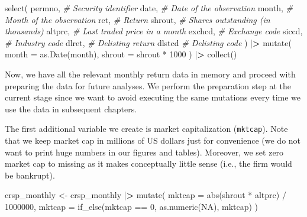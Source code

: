 \documentclass[
]{book}
\newenvironment{Shaded}{\begin{snugshade}}{\end{snugshade}}
\newcommand{\AttributeTok}[1]{\textcolor[rgb]{0.61,0.61,0.61}{#1}}
\newcommand{\CommentTok}[1]{\textcolor[rgb]{0.37,0.37,0.37}{\textit{#1}}}
\newcommand{\ConstantTok}[1]{\textcolor[rgb]{0,0,0}{#1}}
\newcommand{\DecValTok}[1]{\textcolor[rgb]{0.06,0.06,0.06}{#1}}
\newcommand{\ErrorTok}[1]{\textcolor[rgb]{0.14,0.14,0.14}{\textbf{#1}}}
\newcommand{\FunctionTok}[1]{\textcolor[rgb]{0,0,0}{#1}}
\newcommand{\NormalTok}[1]{#1}
\newcommand{\OtherTok}[1]{\textcolor[rgb]{0.37,0.37,0.37}{#1}}
\newcommand{\SpecialCharTok}[1]{\textcolor[rgb]{0,0,0}{#1}}
\begin{document}
\begin{Shaded}
\begin{Highlighting}[]
  \FunctionTok{select}\NormalTok{(}
\NormalTok{    permno, }\CommentTok{\# Security identifier}
\NormalTok{    date, }\CommentTok{\# Date of the observation}
\NormalTok{    month, }\CommentTok{\# Month of the observation}
\NormalTok{    ret, }\CommentTok{\# Return}
\NormalTok{    shrout, }\CommentTok{\# Shares outstanding (in thousands)}
\NormalTok{    altprc, }\CommentTok{\# Last traded price in a month}
\NormalTok{    exchcd, }\CommentTok{\# Exchange code}
\NormalTok{    siccd, }\CommentTok{\# Industry code}
\NormalTok{    dlret, }\CommentTok{\# Delisting return}
\NormalTok{    dlstcd }\CommentTok{\# Delisting code}
\NormalTok{  ) }\SpecialCharTok{|}\ErrorTok{\textgreater{}}
  \FunctionTok{mutate}\NormalTok{(}
    \AttributeTok{month =} \FunctionTok{as.Date}\NormalTok{(month),}
    \AttributeTok{shrout =}\NormalTok{ shrout }\SpecialCharTok{*} \DecValTok{1000}
\NormalTok{  ) }\SpecialCharTok{|}\ErrorTok{\textgreater{}}
  \FunctionTok{collect}\NormalTok{()}
\end{Highlighting}
\end{Shaded}

Now, we have all the relevant monthly return data in memory and proceed with preparing the data for future analyses. We perform the preparation step at the current stage since we want to avoid executing the same mutations every time we use the data in subsequent chapters.

The first additional variable we create is market capitalization (\texttt{mktcap}). Note that we keep market cap in millions of US dollars just for convenience (we do not want to print huge numbers in our figures and tables). Moreover, we set zero market cap to missing as it makes conceptually little sense (i.e., the firm would be bankrupt).

\begin{Shaded}
\begin{Highlighting}[]
\NormalTok{crsp\_monthly }\OtherTok{\textless{}{-}}\NormalTok{ crsp\_monthly }\SpecialCharTok{|}\ErrorTok{\textgreater{}}
  \FunctionTok{mutate}\NormalTok{(}
    \AttributeTok{mktcap =} \FunctionTok{abs}\NormalTok{(shrout }\SpecialCharTok{*}\NormalTok{ altprc) }\SpecialCharTok{/} \DecValTok{1000000}\NormalTok{,}
    \AttributeTok{mktcap =} \FunctionTok{if\_else}\NormalTok{(mktcap }\SpecialCharTok{==} \DecValTok{0}\NormalTok{, }
                     \FunctionTok{as.numeric}\NormalTok{(}\ConstantTok{NA}\NormalTok{), }
\NormalTok{                     mktcap)}
\NormalTok{  )}
\end{Highlighting}
\end{Shaded}
\end{document}
